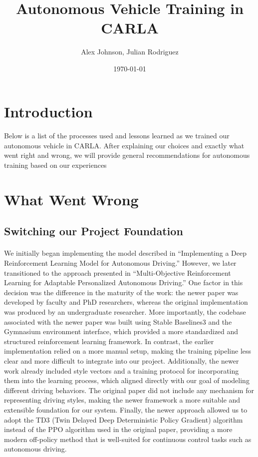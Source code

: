 \documentclass{article}
\title{Autonomous Vehicle Training in CARLA}
\author{Alex Johnson, Julian Rodriguez}
\date{\today}
\begin{document}
\maketitle

\section{Introduction}
\paragraph{}
Below is a list of the processes used and lessons learned 
as we trained our autonomous vehicle in CARLA. After explaining
our choices and exactly what went right and wrong, we will 
provide general recommendations for autonomous training based
on our experiences

\section{What Went Wrong}

\subsection{Switching our Project Foundation}
\paragraph{}
We initially began implementing the model described in “Implementing a Deep Reinforcement Learning Model for Autonomous Driving.” However, we later transitioned to the approach presented in “Multi-Objective Reinforcement Learning for Adaptable Personalized Autonomous Driving.” One factor in this decision was the difference in the maturity of the work: the newer paper was developed by faculty and PhD researchers, whereas the original implementation was produced by an undergraduate researcher. More importantly, the codebase associated with the newer paper was built using Stable Baselines3 and the Gymnasium environment interface, which provided a more standardized and structured reinforcement learning framework. In contrast, the earlier implementation relied on a more manual setup, making the training pipeline less clear and more difficult to integrate into our project. Additionally, the newer work already included style vectors and a training protocol for incorporating them into the learning process, which aligned directly with our goal of modeling different driving behaviors. The original paper did not include any mechanism for representing driving styles, making the newer framework a more suitable and extensible foundation for our system. Finally, the newer approach allowed us to adopt the TD3 (Twin Delayed Deep Deterministic Policy Gradient) algorithm instead of the PPO algorithm used in the original paper, providing a more modern off-policy method that is well-suited for continuous control tasks such as autonomous driving.
\end{document}
